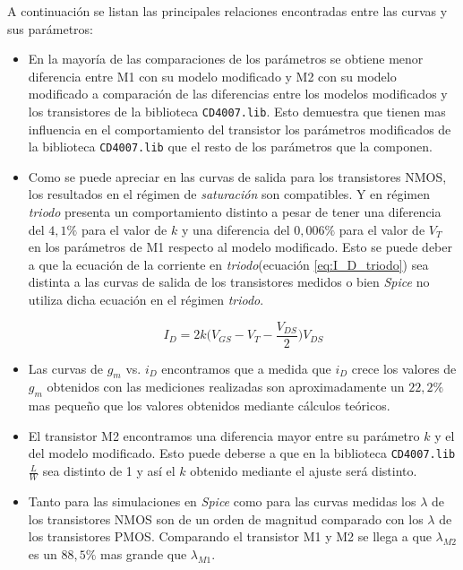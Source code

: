 \documentclass[10pt,spanish,a4paper,openany,notitlepage]{article}
\begin{document}
A continuación se listan las principales relaciones encontradas entre las curvas y sus parámetros:

\begin{itemize}

\item En la mayoría de las comparaciones de los parámetros se obtiene menor diferencia entre M1 con su modelo modificado y M2 con  su modelo modificado a comparación de las diferencias entre los modelos modificados y los transistores de la biblioteca \texttt{CD4007.lib}. Esto demuestra que tienen mas influencia en el comportamiento del transistor los parámetros modificados de la biblioteca \texttt{CD4007.lib} que el resto de los parámetros que la componen.

\item Como se puede apreciar en las curvas de salida para los transistores NMOS, los resultados en el régimen de \emph{saturación} son compatibles.
Y en régimen \emph{triodo}  presenta un comportamiento distinto  a pesar de tener una diferencia del $4,1\%$ para el valor de $k$ y una diferencia del $0,006\%$ para el valor de $V_T$  en los parámetros de M1 respecto al modelo modificado. Esto se puede deber a que la ecuación de la corriente en \emph{triodo}(ecuación \ref{eq:I_D_triodo}) sea distinta a las curvas de salida de los transistores medidos o bien \emph{Spice} no utiliza dicha ecuación en el régimen \emph{triodo}.

\begin{equation}
I_D = 2 k \Big(V_{GS} - V_T - \frac{V_{DS}}{2}\Big) V_{DS}
\label{eq:I_D_triodo}
\end{equation}

\item Las curvas de $g_m$ vs. $i_D$ encontramos que a medida que $i_D$ crece los valores de $g_m$ obtenidos con las mediciones realizadas  son aproximadamente un $22,2\%$ mas pequeño que los valores obtenidos mediante cálculos teóricos.

\item El transistor M2 encontramos una diferencia mayor entre su parámetro $k$ y el del modelo modificado. Esto puede deberse a que en la biblioteca \texttt{CD4007.lib} $\frac{L}{W}$ sea distinto de 1 y así el $k$ obtenido mediante el ajuste será distinto.

\item Tanto para las simulaciones en \emph{Spice} como para las curvas medidas los $\lambda$ de los transistores NMOS son de un orden de magnitud comparado con los $\lambda$ de los transistores PMOS. Comparando el transistor M1 y M2 se llega a que $\lambda_{M2}$ es un $88,5\%$ mas grande que $\lambda_{M1}$. 

\end{itemize}
\end{document}
